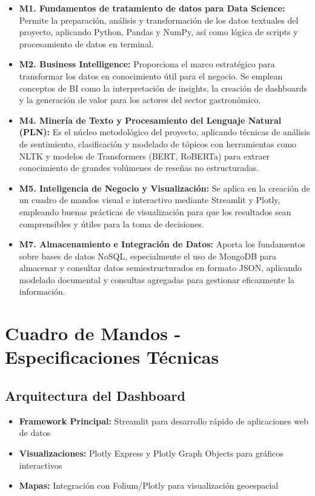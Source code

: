 \documentclass[12pt,a4paper]{article}
\begin{document}
\begin{itemize}[label=\textbullet]
    \item \textbf{M1. Fundamentos de tratamiento de datos para Data Science:} Permite la preparación, análisis y transformación de los datos textuales del proyecto, aplicando Python, Pandas y NumPy, así como lógica de scripts y procesamiento de datos en terminal.
    
    \item \textbf{M2. Business Intelligence:} Proporciona el marco estratégico para transformar los datos en conocimiento útil para el negocio. Se emplean conceptos de BI como la interpretación de insights, la creación de dashboards y la generación de valor para los actores del sector gastronómico.
    
    \item \textbf{M4. Minería de Texto y Procesamiento del Lenguaje Natural (PLN):} Es el núcleo metodológico del proyecto, aplicando técnicas de análisis de sentimiento, clasificación y modelado de tópicos con herramientas como NLTK y modelos de Transformers (BERT, RoBERTa) para extraer conocimiento de grandes volúmenes de reseñas no estructuradas.
    
    \item \textbf{M5. Inteligencia de Negocio y Visualización:} Se aplica en la creación de un cuadro de mandos visual e interactivo mediante Streamlit y Plotly, empleando buenas prácticas de visualización para que los resultados sean comprensibles y útiles para la toma de decisiones.
    
    \item \textbf{M7. Almacenamiento e Integración de Datos:} Aporta los fundamentos sobre bases de datos NoSQL, especialmente el uso de MongoDB para almacenar y consultar datos semiestructurados en formato JSON, aplicando modelado documental y consultas agregadas para gestionar eficazmente la información.
\end{itemize}

\section{Cuadro de Mandos - Especificaciones Técnicas}

\subsection{Arquitectura del Dashboard}

\begin{itemize}[label=\textbullet]
    \item \textbf{Framework Principal:} Streamlit para desarrollo rápido de aplicaciones web de datos
    \item \textbf{Visualizaciones:} Plotly Express y Plotly Graph Objects para gráficos interactivos
    \item \textbf{Mapas:} Integración con Folium/Plotly para visualización geoespacial
\end{itemize}
\end{document}
